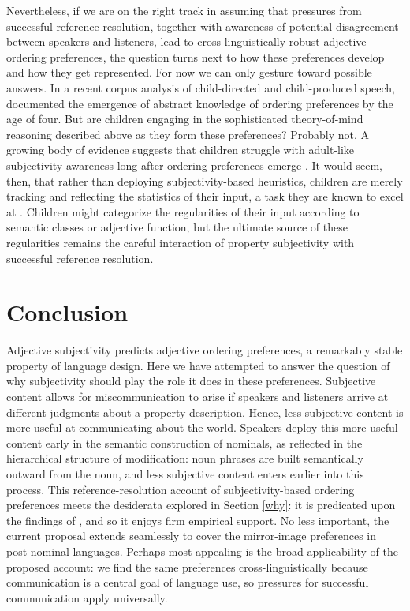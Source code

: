 \documentclass[preprint,authoryear]{elsarticle}\frenchspacing
\newcommand{\gcs}[1]{\textcolor{blue}{[gcs: #1]}}
\begin{document}
Nevertheless, if we are on the right track in assuming that pressures from successful reference resolution, together with awareness of potential disagreement between speakers and listeners, lead to cross-linguistically robust adjective ordering preferences, the question turns next to how these preferences develop and how they get represented. For now we can only gesture toward possible answers. In a recent corpus analysis of child-directed and child-produced speech, \cite{barseveretal2017} documented the emergence of abstract knowledge of ordering preferences by the age of four. But are children engaging in the sophisticated theory-of-mind reasoning described above as they form these preferences? Probably not. A growing body of evidence suggests that children struggle with adult-like subjectivity awareness long after ordering preferences emerge \citep{fousheesrinivasan2017}. It would seem, then, that rather than deploying subjectivity-based heuristics, children are merely tracking and reflecting the statistics of their input, a task they are known to excel at \citep[e.g.,][]{saffranetal1996}. Children might categorize the regularities of their input according to semantic classes or adjective function, but the ultimate source of these regularities remains the careful interaction of property subjectivity with successful reference resolution. %






\section{Conclusion} \label{conclusion}

Adjective subjectivity predicts adjective ordering preferences, a remarkably stable property of language design. Here we have attempted to answer the question of why subjectivity should play the role it does in these preferences. Subjective content allows for miscommunication to arise if speakers and listeners arrive at different judgments about a property description. Hence, less subjective content is more useful at communicating about the world. Speakers deploy this more useful content early in the semantic construction of nominals, as reflected in the hierarchical structure of modification: noun phrases are built semantically outward from the noun, and less subjective content enters earlier into this process. This reference-resolution account of subjectivity-based ordering preferences meets the desiderata explored in Section \ref{why}: it is predicated upon the findings of \cite{scontrasetal2017adjectives}, and so it enjoys firm empirical support. No less important, the current proposal extends seamlessly to cover the mirror-image preferences in post-nominal languages. Perhaps most appealing is the broad applicability of the proposed account: we find the same preferences cross-linguistically because communication is a central goal of language use, so pressures for successful communication apply universally.
\end{document}
